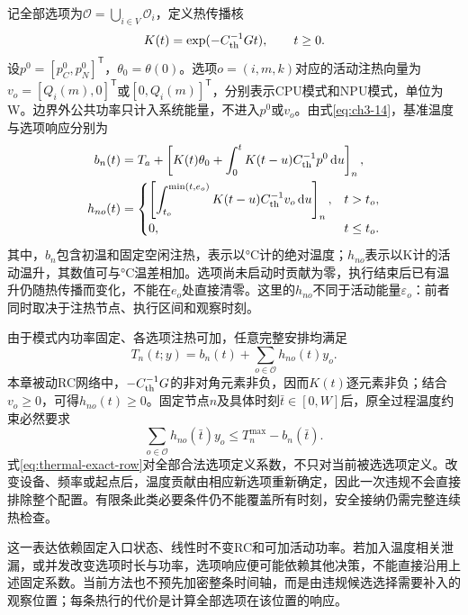 记全部选项为\(\mathcal O=\bigcup_{i\in V}\mathcal O_i\)，定义热传播核
\begin{equation}
K(t)=\exp(-C_{\rm th}^{-1}Gt),\qquad t\ge0.
\label{eq:thermal-kernel}
\end{equation}
设\(p^0=[p_C^0,p_N^0]^{\mathsf T}\)，\(\theta_0=\theta(0)\)。选项\(o=(i,m,k)\)对应的活动注热向量为\(v_o=[Q_i(m),0]^{\mathsf T}\)或\([0,Q_i(m)]^{\mathsf T}\)，分别表示CPU模式和NPU模式，单位为W。边界外公共功率只计入系统能量，不进入\(p^0\)或\(v_o\)。由式\eqref{eq:ch3-14}，基准温度与选项响应分别为
\begin{equation}
\begin{aligned}
b_n(t)&=T_a+\left[K(t)\theta_0+
\int_0^t K(t-u)C_{\rm th}^{-1}p^0\,\mathrm du\right]_n,\\
h_{no}(t)&=
\begin{cases}
\displaystyle\left[\int_{t_o}^{\min(t,e_o)}
K(t-u)C_{\rm th}^{-1}v_o\,\mathrm du\right]_n,&t>t_o,\\
0,&t\le t_o.
\end{cases}
\end{aligned}
\label{eq:thermal-option-response}
\end{equation}
其中，\(b_n\)包含初温和固定空闲注热，表示以°C计的绝对温度；\(h_{no}\)表示以K计的活动温升，其数值可与°C温差相加。选项尚未启动时贡献为零，执行结束后已有温升仍随热传播而变化，不能在\(e_o\)处直接清零。这里的\(h_{no}\)不同于活动能量\(\varepsilon_o\)：前者同时取决于注热节点、执行区间和观察时刻。

由于模式内功率固定、各选项注热可加，任意完整安排均满足
\begin{equation}
T_n(t;y)=b_n(t)+\sum_{o\in\mathcal O}h_{no}(t)y_o.
\label{eq:thermal-affine}
\end{equation}
本章被动RC网络中，\(-C_{\rm th}^{-1}G\)的非对角元素非负，因而\(K(t)\)逐元素非负；结合\(v_o\ge0\)，可得\(h_{no}(t)\ge0\)。固定节点\(n\)及具体时刻\(\bar t\in[0,W]\)后，原全过程温度约束必然要求
\begin{equation}
\sum_{o\in\mathcal O}h_{no}(\bar t)y_o
\le T_n^{\max}-b_n(\bar t).
\label{eq:thermal-exact-row}
\end{equation}
式\eqref{eq:thermal-exact-row}对全部合法选项定义系数，不只对当前被选选项定义。改变设备、频率或起点后，温度贡献由相应新选项重新确定，因此一次违规不会直接排除整个配置。有限条此类必要条件仍不能覆盖所有时刻，安全接纳仍需完整连续热检查。

这一表达依赖固定入口状态、线性时不变RC和可加活动功率。若加入温度相关泄漏，或并发改变选项时长与功率，选项响应便可能依赖其他决策，不能直接沿用上述固定系数。当前方法也不预先加密整条时间轴，而是由违规候选选择需要补入的观察位置；每条热行的代价是计算全部选项在该位置的响应。

